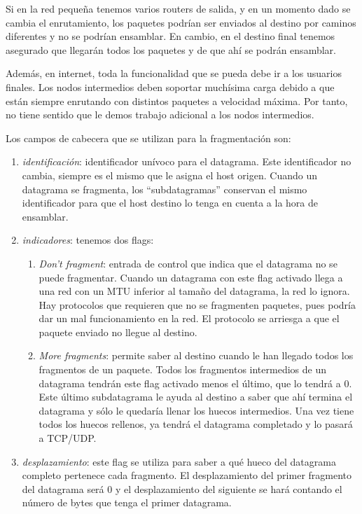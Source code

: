 \documentclass[10pt,a4paper,spanish]{report}
\begin{document}
Si en la red pequeña tenemos varios routers de salida, y en un momento dado se cambia el enrutamiento, los paquetes podrían ser enviados al destino por caminos diferentes y no se podrían ensamblar. En cambio, en el destino final tenemos asegurado que llegarán todos los paquetes y de que ahí se podrán ensamblar.

Además, en internet, toda la funcionalidad que se pueda debe ir a los usuarios finales. Los nodos intermedios deben soportar muchísima carga debido a que están siempre enrutando con distintos paquetes a velocidad máxima. Por tanto, no tiene sentido que le demos trabajo adicional a los nodos intermedios.

Los campos de cabecera que se utilizan para la fragmentación son:

\begin{enumerate}[\color{tema4}{$\flat$}]
  \item \textit{\textcolor{tema4}{identificación}}: identificador unívoco para el datagrama. Este identificador no cambia, siempre es el mismo que le asigna el host origen. Cuando un datagrama se fragmenta, los ``subdatagramas'' conservan el mismo identificador para que el host destino lo tenga en cuenta a la hora de ensamblar.
  \item \textit{\textcolor{tema4}{indicadores}}: tenemos dos flags:
  \begin{enumerate}[\color{tema4}{$\longrightarrow$}]
    \item \textit{\textcolor{tema4}{Don't fragment}}: entrada de control que indica que el datagrama no se puede fragmentar. Cuando un datagrama con este flag activado llega a una red con un MTU inferior al tamaño del datagrama, la red lo ignora. Hay protocolos que requieren que no se fragmenten paquetes, pues podría dar un mal funcionamiento en la red. El protocolo se arriesga a que el paquete enviado no llegue al destino.
    \item \textit{\textcolor{tema4}{More fragments}}: permite saber al destino cuando le han llegado todos los fragmentos de un paquete. Todos los fragmentos intermedios de un datagrama tendrán este flag activado menos el último, que lo tendrá a 0. Este último subdatagrama le ayuda al destino a saber que ahí termina el datagrama y sólo le quedaría llenar los huecos intermedios. Una vez tiene todos los huecos rellenos, ya tendrá el datagrama completado y lo pasará a TCP/UDP. 
  \end{enumerate}
  \item \textit{\textcolor{tema4}{desplazamiento}}: este flag se utiliza para saber a qué hueco del datagrama completo pertenece cada fragmento. El desplazamiento del primer fragmento del datagrama será 0 y el desplazamiento del siguiente se hará contando el número de bytes que tenga el primer datagrama.
\end{enumerate}
\end{document}
